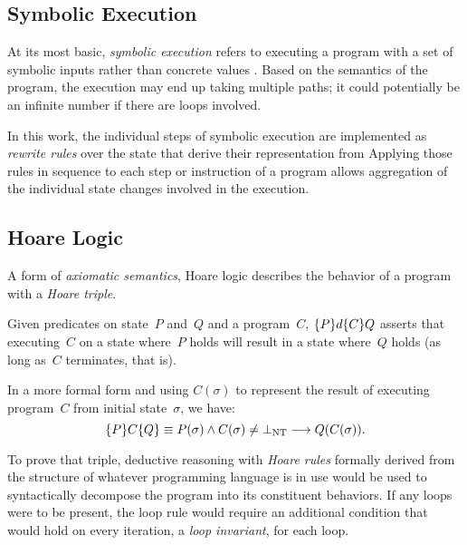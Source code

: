 \subsection{Symbolic Execution}
At its most basic, \emph{symbolic execution} refers to
executing a program with a set of symbolic inputs
rather than concrete values \autocite{king1976symbolic}.
Based on the semantics of the program, the execution may end up taking multiple paths;
it could potentially be an infinite number if there are loops involved.

In this work, the individual steps of symbolic execution
are implemented as \emph{rewrite rules} over the state%
that derive their representation from
Applying those rules in sequence to each step or instruction of a program
allows aggregation of the individual state changes involved in the execution.


\subsection{Hoare Logic}\label{se:hoare}
A form of \emph{axiomatic semantics},
Hoare logic \autocite{hoare1969axiomatic,myreen2007hoare}%
describes the behavior of a program with a \emph{Hoare triple}.
\begin{definition}
  Given predicates on state~$P$ and~$Q$ and a program~$C$,
  $\{P\}d\{C\}{Q}$ asserts that executing~$C$ on a state where~$P$ holds
  will result in a state where~$Q$ holds (as long as~$C$ terminates, that is).

  In a more formal form and using $C(\sigma)$ to represent the result
  of executing program~$C$ from initial state~$\sigma$, we have:
  \begin{equation*}
    \{P\}C\{Q\}\equiv P(\sigma)\wedge C(\sigma)\neq\bot_\mathrm{NT}\longrightarrow
    Q(C(\sigma)).
  \end{equation*}
\end{definition}
To prove that triple, deductive reasoning with \emph{Hoare rules}%
formally derived from the structure of whatever programming language is in use
would be used to syntactically decompose the program into its constituent behaviors.
If any loops were to be present, the loop rule would require an additional condition
that would hold on every iteration, a \emph{loop invariant}, for each loop.

